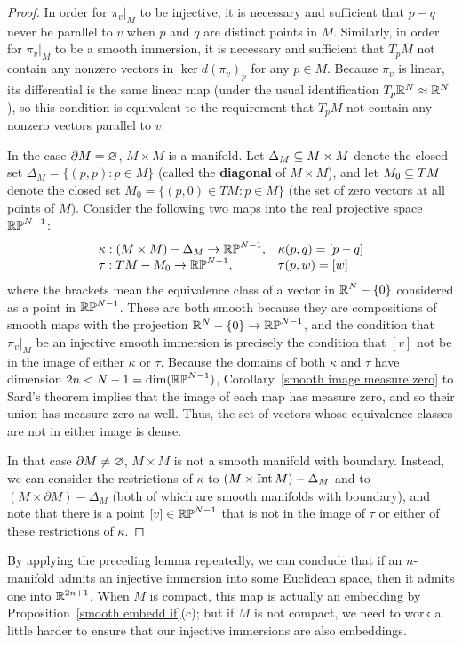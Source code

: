 \begin{proof}
In order for $\pi_v|_M$ to be injective, it is necessary and sufficient that $p-q$ never be parallel to $v$ when $p$ and $q$ are distinct points in $M$. Similarly, in order for $\pi_v|_M$ to be a smooth immersion, it is necessary and sufficient that $T_pM$ not contain any nonzero vectors in $\ker d(\pi_v)_p$ for any $p\in M$. Because $\pi_v$ is linear, its differential is the same linear map (under the usual identification $T_p\mathbb{R}^N\approx\mathbb{R}^N$), so this condition is equivalent to the requirement that $T_pM$ not contain any nonzero vectors parallel to $v$.\par
In the case $\partial M=\varnothing$, $M\times M$ is a manifold. Let $\Delta_M\subseteq M\times M$ denote the closed set $\Delta_M=\{(p,p):p\in M\}$ (called the \textbf{diagonal} of $M\times M$), and let $M_0\subseteq TM$ denote the closed set $M_0=\{(p,0)\in TM:p\in M\}$ (the set of zero vectors at all points of $M$). Consider the following two maps into the real projective space $\mathbb{RP}^{N-1}$:
\[\begin{array}{ll}
\kappa:(M\times M)-\Delta_M\to\mathbb{RP}^{N-1},&\kappa(p,q)=[p-q]\\
\tau:TM-M_0\to\mathbb{RP}^{N-1},&\tau(p,w)=[w]
\end{array}\]
where the brackets mean the equivalence class of a vector in $\mathbb{R}^{N}-\{0\}$ considered as a point in $\mathbb{RP}^{N-1}$. These are both smooth because they are compositions of smooth maps with the projection $\mathbb{R}^N-\{0\}\to\mathbb{RP}^{N-1}$, and the condition that $\pi_v|_M$ be an injective smooth immersion is precisely the condition that $[v]$ not be in the image of either $\kappa$ or $\tau$. Because the domains of both $\kappa$ and $\tau$ have dimension $2n<N-1=\dim(\mathbb{RP}^{N-1})$, Corollary~\ref{smooth image measure zero} to Sard's theorem implies that the image of each map has measure zero, and so their union has measure zero as well. Thus, the set of vectors whose equivalence classes are not in either image is dense.\par
In that case $\partial M\neq\varnothing$, $M\times M$ is not a smooth manifold with boundary. Instead, we can consider the restrictions of $\kappa$ to $(M\times\mathrm{Int}\, M)-\Delta_M$ and to $(M\times\partial M)-\Delta_M$ (both of which are smooth manifolds with boundary), and note that there is a point $[v]\in\mathbb{RP}^{N-1}$ that is not in the image of $\tau$ or either of these restrictions of $\kappa$.
\end{proof}
By applying the preceding lemma repeatedly, we can conclude that if an $n$-manifold admits an injective immersion into some Euclidean space, then it admits one into $\mathbb{R}^{2n+1}$. When $M$ is compact, this map is actually an embedding by Proposition~\ref{smooth embedd if}(c); but if $M$ is not compact, we need to work a little harder to ensure that our injective immersions are also embeddings.
